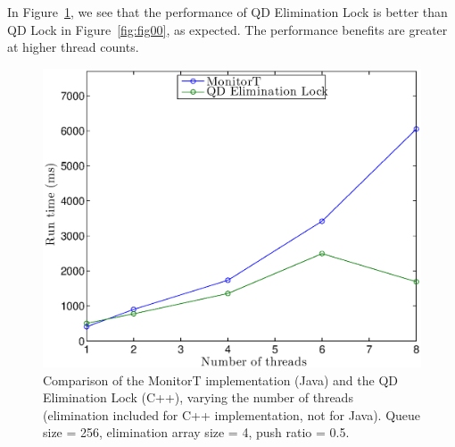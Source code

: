 
In Figure~\ref{fig:fig02}, we see that the performance of QD Elimination Lock is better than QD Lock in Figure~\ref{fig:fig00}, as expected. The performance benefits are greater at higher thread counts.

\begin{figure}[]
\centering
\includegraphics[width=.75\textwidth]{figs/02_TimeVsThreads_cppElim_javaNoElim.eps}
\caption[]{Comparison of the MonitorT implementation (Java) and the QD Elimination Lock (C++), varying the number of threads (elimination included for C++ implementation, not for Java). Queue size = 256, elimination array size = 4, push ratio = 0.5.}
\label{fig:fig02}
\end{figure}




